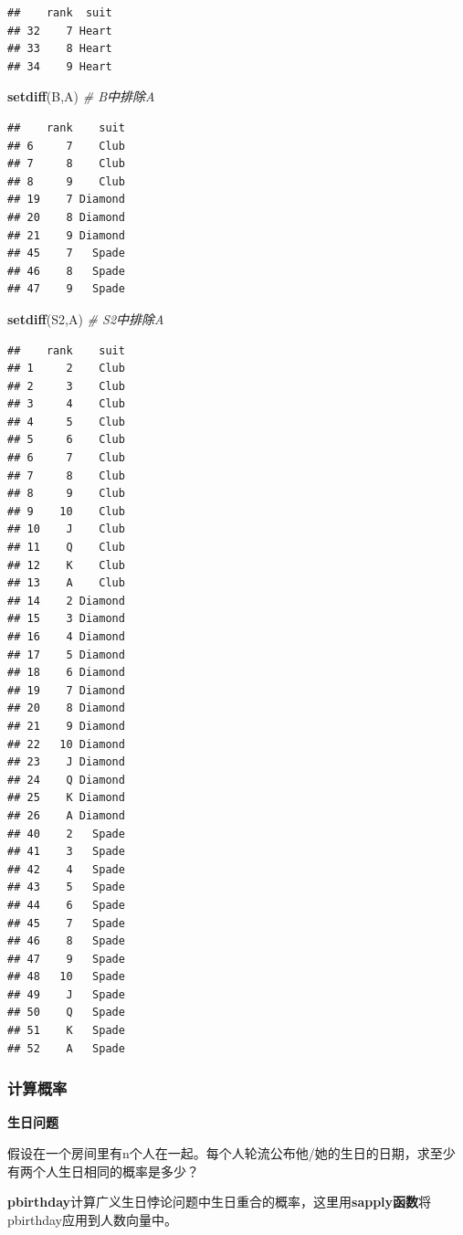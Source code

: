 \documentclass[]{article}
\newenvironment{Shaded}{\begin{snugshade}}{\end{snugshade}}
\newcommand{\KeywordTok}[1]{\textcolor[rgb]{0.13,0.29,0.53}{\textbf{{#1}}}}
\newcommand{\CommentTok}[1]{\textcolor[rgb]{0.56,0.35,0.01}{\textit{{#1}}}}
\newcommand{\NormalTok}[1]{{#1}}
\begin{document}
\begin{verbatim}
##    rank  suit
## 32    7 Heart
## 33    8 Heart
## 34    9 Heart
\end{verbatim}

\begin{Shaded}
\begin{Highlighting}[]
\KeywordTok{setdiff}\NormalTok{(B,A) }\CommentTok{# B中排除A}
\end{Highlighting}
\end{Shaded}

\begin{verbatim}
##    rank    suit
## 6     7    Club
## 7     8    Club
## 8     9    Club
## 19    7 Diamond
## 20    8 Diamond
## 21    9 Diamond
## 45    7   Spade
## 46    8   Spade
## 47    9   Spade
\end{verbatim}

\begin{Shaded}
\begin{Highlighting}[]
\KeywordTok{setdiff}\NormalTok{(S2,A) }\CommentTok{# S2中排除A}
\end{Highlighting}
\end{Shaded}

\begin{verbatim}
##    rank    suit
## 1     2    Club
## 2     3    Club
## 3     4    Club
## 4     5    Club
## 5     6    Club
## 6     7    Club
## 7     8    Club
## 8     9    Club
## 9    10    Club
## 10    J    Club
## 11    Q    Club
## 12    K    Club
## 13    A    Club
## 14    2 Diamond
## 15    3 Diamond
## 16    4 Diamond
## 17    5 Diamond
## 18    6 Diamond
## 19    7 Diamond
## 20    8 Diamond
## 21    9 Diamond
## 22   10 Diamond
## 23    J Diamond
## 24    Q Diamond
## 25    K Diamond
## 26    A Diamond
## 40    2   Spade
## 41    3   Spade
## 42    4   Spade
## 43    5   Spade
## 44    6   Spade
## 45    7   Spade
## 46    8   Spade
## 47    9   Spade
## 48   10   Spade
## 49    J   Spade
## 50    Q   Spade
## 51    K   Spade
## 52    A   Spade
\end{verbatim}

\subsubsection{计算概率}

\textbf{生日问题}

假设在一个房间里有n个人在一起。每个人轮流公布他/她的生日的日期，求至少有两个人生日相同的概率是多少？

\textbf{pbirthday}计算广义生日悖论问题中生日重合的概率，这里用\textbf{sapply函数}将pbirthday应用到人数向量中。
\end{document}

